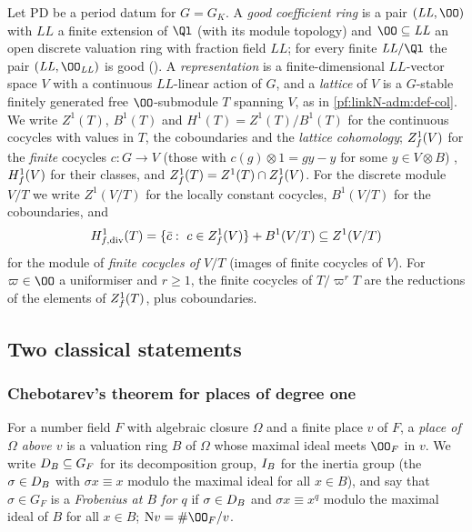 \begin{definition}\label{pf:sh-hodge:def-coh}
Let $\mathrm{PD}$ be a period datum for $G=G_K$. A \emph{good coefficient ring} is a pair $(\mathit{LL},\OO)$ with $\mathit{LL}$ a
finite extension of $\Ql$ (with its module topology) and $\OO\subseteq\mathit{LL}$ an open discrete valuation ring with fraction
field $\mathit{LL}$; for every finite $\mathit{LL}/\Ql$ the pair $(\mathit{LL},\OO_{\mathit{LL}})$ is good
(). A \emph{representation} is a finite-dimensional
$\mathit{LL}$-vector space $V$ with a continuous $\mathit{LL}$-linear action of $G$, and a \emph{lattice} of $V$ is a $G$-stable
finitely generated free $\OO$-submodule $T$ spanning $V$, as in \cref{pf:linkN-adm:def-col}. We write $Z^1(T)$, $B^1(T)$ and
$H^1(T)=Z^1(T)/B^1(T)$ for the continuous cocycles with values in $T$, the coboundaries and the \emph{lattice cohomology};
$Z^1_{f}(V)$ for the \emph{finite} cocycles $c\colon G\to V$ (those with $c(g)\otimes1=gy-y$ for some $y\in V\otimes B$)
\cite{BlochKato1990}, $H^1_{f}(V)$ for their classes, and $Z^1_{f}(T)=Z^1(T)\cap Z^1_{f}(V)$. For the discrete module
$V/T$ we write $Z^1(V/T)$ for the locally constant cocycles, $B^1(V/T)$ for the coboundaries, and
\[
\shhodgeHfD(T)=\{\bar c:\ c\in\shhodgeZf(V)\}+B^1(V/T)\subseteq Z^1(V/T)
\]
for the module of \emph{finite cocycles of $V/T$} (images of finite cocycles of $V$). For $\varpi\in\OO$ a uniformiser and
$r\ge1$, the finite cocycles of $T/\varpi^rT$ are the reductions of the elements of $Z^1_{f}(T)$, plus coboundaries.
\end{definition}

\subsection{Two classical statements}\label{pf:sh-hodge:classical}

\subsubsection{Chebotarev's theorem for places of degree one}

For a number field $F$ with algebraic closure $\Omega$ and a finite place $v$ of $F$, a \emph{place of $\Omega$ above $v$} is a
valuation ring $B$ of $\Omega$ whose maximal ideal meets $\OO_F$ in $v$. We write $D_B\subseteq G_F$ for its
decomposition group, $I_B$ for the inertia group (the $\sigma\in D_B$ with $\sigma x\equiv x$ modulo the
maximal ideal for all $x\in B$), and say that $\sigma\in G_F$ is a \emph{Frobenius at $B$ for $q$} if $\sigma\in D_B$
and $\sigma x\equiv x^q$ modulo the maximal ideal of $B$ for all $x\in B$; $\shhodgeNm v=\#\OO_F/v$.

